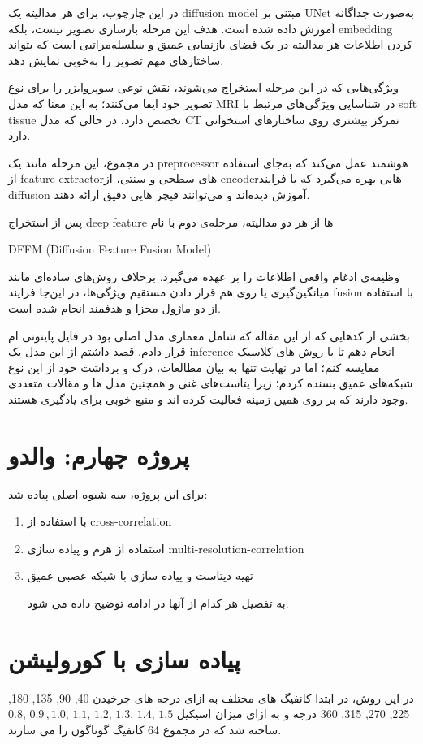 \documentclass[a4paper,12pt]{article}
\begin{document}
 در این چارچوب، برای هر مدالیته یک diffusion model مبتنی بر UNet به‌صورت جداگانه آموزش داده شده است. هدف این مرحله بازسازی تصویر نیست، بلکه embedding کردن اطلاعات هر مدالیته در یک فضای بازنمایی عمیق و سلسله‌مراتبی است که بتواند ساختارهای مهم تصویر را به‌خوبی نمایش دهد.
 
 ویژگی‌هایی که در این مرحله استخراج می‌شوند، نقش نوعی سوپروایزر را برای نوع تصویر خود ایفا می‌کنند؛ به این معنا که مدل MRI در شناسایی ویژگی‌های مرتبط با soft tissue تخصص دارد، در حالی که مدل CT تمرکز بیشتری روی ساختارهای استخوانی دارد.
 
 در مجموع، این مرحله مانند یک preprocessor هوشمند عمل می‌کند که به‌جای استفاده از feature extractorهای سطحی و سنتی، از encoderهایی بهره می‌گیرد که با فرایند diffusion آموزش دیده‌اند و می‌توانند فیچر ‌هایی دقیق ارائه دهند.
 
 پس از استخراج deep feature
 ها از هر دو مدالیته، مرحله‌ی دوم با نام 
 \begin{latin}
DFFM (Diffusion Feature Fusion Model) 
 \end{latin}
 
 
 وظیفه‌ی ادغام واقعی اطلاعات را بر عهده می‌گیرد. برخلاف روش‌های ساده‌ای مانند میانگین‌گیری یا روی هم قرار دادن مستقیم ویژگی‌ها، در این‌جا فرایند fusion با استفاده از دو ماژول مجزا و هدفمند انجام شده است.
 

بخشی از کدهایی که از این مقاله که شامل معماری مدل اصلی بود در فایل پایتونی ام قرار دادم.
قصد داشتم از این مدل یک inference انجام دهم تا با روش های کلاسیک مقایسه کنم؛ اما در نهایت تنها به بیان مطالعات، درک و برداشت خود از این نوع شبکه‌های عمیق بسنده کردم؛ زیرا  یتاست‌های غنی و همچنین مدل‌ ها و مقالات متعددی وجود دارند که بر روی همین زمینه فعالیت کرده اند و منبع خوبی برای یادگیری هستند.

\pagebreak
\section{پروژه چهارم: والدو}
برای این پروژه، سه شیوه اصلی پیاده شد:
\begin{enumerate}
	\item  با استفاده از cross-correlation
	\item استفاده از هرم و پیاده سازی multi-resolution-correlation
	\item تهیه دیتاست و پیاده سازی با شبکه عصبی عمیق
	
	به تفصیل هر کدام از آنها در ادامه توضیح داده می شود:
	
\end{enumerate}


\section*{پیاده سازی با کورولیشن}
در این روش، در ابتدا کانفیگ های مختلف به ازای درجه های چرخیدن
40, 90, 135, 180, 225, 270, 315, 360 درجه و به ازای میزان اسیکیل
$
 0.8,\, 0.9 \, , 1.0,\,  1.1, \, 1.2,\,  1.3,\,  1.4,\, 1.5$
 ساخته شد که در مجموع 64 کانفیگ گوناگون را می سازند. 
  
\end{document}
